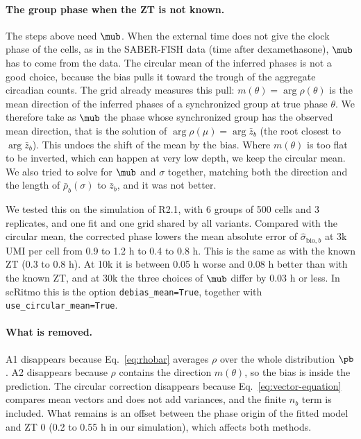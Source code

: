 \paragraph{The group phase when the ZT is not known.}

The steps above need $\mub$. When the external time does not give the clock phase of the cells, as in the SABER-FISH data (time after dexamethasone), $\mub$ has to come from the data. The circular mean of the inferred phases is not a good choice, because the bias pulls it toward the trough of the aggregate circadian counts. The grid already measures this pull: $m(\theta) = \arg\rho(\theta)$ is the mean direction of the inferred phases of a synchronized group at true phase $\theta$. We therefore take as $\mub$ the phase whose synchronized group has the observed mean direction, that is the solution of $\arg\rho(\mu) = \arg\bar z_b$ (the root closest to $\arg\bar z_b$). This undoes the shift of the mean by the bias. Where $m(\theta)$ is too flat to be inverted, which can happen at very low depth, we keep the circular mean. We also tried to solve for $\mub$ and $\sigma$ together, matching both the direction and the length of $\bar\rho_b(\sigma)$ to $\bar z_b$, and it was not better.

We tested this on the simulation of R2.1, with 6 groups of 500 cells and 3 replicates, and one fit and one grid shared by all variants. Compared with the circular mean, the corrected phase lowers the mean absolute error of $\hat\sigma_{\text{bio},b}$ at 3k UMI per cell from 0.9 to 1.2 h to 0.4 to 0.8 h. This is the same as with the known ZT (0.3 to 0.8 h). At 10k it is between 0.05 h worse and 0.08 h better than with the known ZT, and at 30k the three choices of $\mub$ differ by 0.03 h or less. In scRitmo this is the option \texttt{debias\_mean=True}, together with \texttt{use\_circular\_mean=True}.

\paragraph{What is removed.}

A1 disappears because Eq.~\eqref{eq:rhobar} averages $\rho$ over the whole distribution $\pb$. A2 disappears because $\rho$ contains the direction $m(\theta)$, so the bias is inside the prediction. The circular correction disappears because Eq.~\eqref{eq:vector-equation} compares mean vectors and does not add variances, and the finite $n_b$ term is included. What remains is an offset between the phase origin of the fitted model and ZT 0 (0.2 to 0.55 h in our simulation), which affects both methods.

